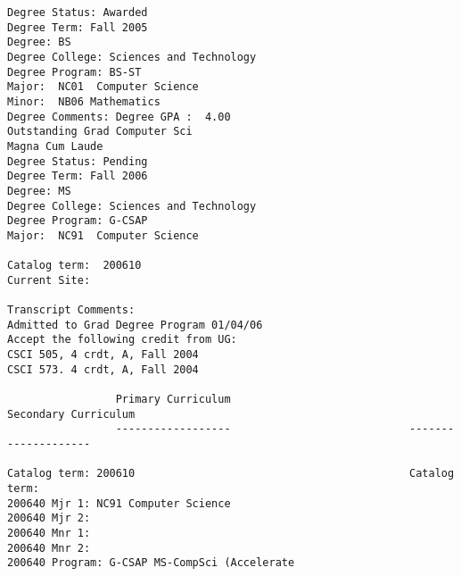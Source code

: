 \documentclass[line]{res}
\begin{document}
\begin{resume}
\begin{verbatim}
Degree Status: Awarded
Degree Term: Fall 2005
Degree: BS
Degree College: Sciences and Technology
Degree Program: BS-ST
Major:  NC01  Computer Science
Minor:  NB06 Mathematics
Degree Comments: Degree GPA :  4.00
Outstanding Grad Computer Sci
Magna Cum Laude
Degree Status: Pending
Degree Term: Fall 2006
Degree: MS
Degree College: Sciences and Technology
Degree Program: G-CSAP
Major:  NC91  Computer Science
 
Catalog term:  200610
Current Site:      
 
Transcript Comments:
Admitted to Grad Degree Program 01/04/06
Accept the following credit from UG:
CSCI 505, 4 crdt, A, Fall 2004
CSCI 573. 4 crdt, A, Fall 2004
                                                                                
                 Primary Curriculum                            Secondary Curriculum                         
                 ------------------                            --------------------                         
 
Catalog term: 200610                                           Catalog term:  
200640 Mjr 1: NC91 Computer Science                                                        
200640 Mjr 2:                                                                              
200640 Mnr 1:                                                                              
200640 Mnr 2:                                                                              
200640 Program: G-CSAP MS-CompSci (Accelerate               
\end{verbatim}

\end{resume}
\end{document}
